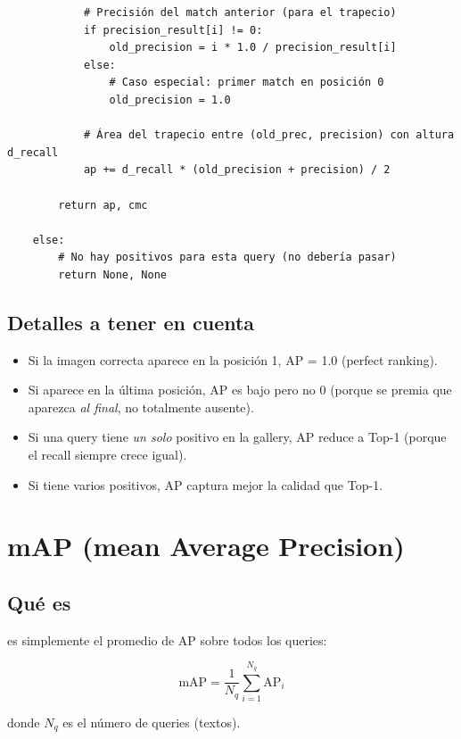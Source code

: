 \begin{verbatim}
            # Precisión del match anterior (para el trapecio)
            if precision_result[i] != 0:
                old_precision = i * 1.0 / precision_result[i]
            else:
                # Caso especial: primer match en posición 0
                old_precision = 1.0

            # Área del trapecio entre (old_prec, precision) con altura d_recall
            ap += d_recall * (old_precision + precision) / 2

        return ap, cmc

    else:
        # No hay positivos para esta query (no debería pasar)
        return None, None
\end{verbatim}

\subsection*{Detalles a tener en cuenta}

\begin{itemize}
  \item Si la imagen correcta aparece en la posición 1, AP = 1.0
        (perfect ranking).
  \item Si aparece en la última posición, AP es bajo pero no 0
        (porque se premia que aparezca \emph{al final}, no
        totalmente ausente).
  \item Si una query tiene \emph{un solo} positivo en la gallery,
        AP reduce a Top-1 (porque el recall siempre crece igual).
  \item Si tiene varios positivos, AP captura mejor la calidad
        que Top-1.
\end{itemize}

\section{mAP (mean Average Precision)}

\subsection*{Qué es}

 es simplemente el promedio de AP sobre todos
los queries:

\begin{equation}
  \text{mAP} = \frac{1}{N_q} \sum_{i=1}^{N_q} \text{AP}_i
  \label{eq:map}
\end{equation}

\noindent donde $N_q$ es el número de queries (textos).

